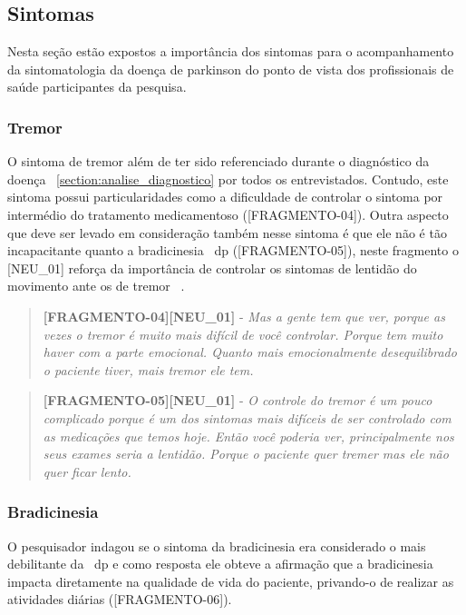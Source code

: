 \subsection{Sintomas}
Nesta seção estão expostos a importância dos sintomas para o acompanhamento da sintomatologia da doença de parkinson do ponto de vista dos profissionais de saúde participantes da pesquisa.

\subsubsection{Tremor}
O sintoma de tremor além de ter sido referenciado durante o diagnóstico da doença ~\ref{section:analise_diagnostico} por todos os entrevistados. Contudo, este sintoma possui particularidades como a dificuldade de controlar o sintoma por intermédio do tratamento medicamentoso ([FRAGMENTO-04]). Outra aspecto que deve ser levado em consideração também nesse sintoma é que ele não é tão incapacitante quanto a bradicinesia ~\ac{dp} ([FRAGMENTO-05]), neste fragmento o [NEU\_01] reforça da importância de controlar os sintomas de lentidão do movimento ante os de tremor ~\cite{do2007parkinson}.

\begin{quote}
\textbf{[FRAGMENTO-04][NEU\_01]} - 
\emph{
Mas a gente tem que ver, porque as vezes o tremor é muito mais difícil de você controlar. Porque tem muito haver com a parte emocional. Quanto mais emocionalmente desequilibrado o paciente tiver, mais tremor ele tem.
}
\end{quote}

\begin{quote}
\textbf{[FRAGMENTO-05][NEU\_01]} - 
\emph{
O controle do tremor é um pouco complicado porque é um dos sintomas mais difíceis de ser controlado com as medicações  que temos hoje.  Então você poderia ver, principalmente nos seus exames seria a lentidão. Porque o paciente quer tremer mas ele não quer ficar lento.
}
\end{quote}


\subsubsection{Bradicinesia}\label{section:analise_bradicinesia}

O pesquisador indagou se o sintoma da bradicinesia era considerado o mais debilitante da ~\ac{dp} e como resposta ele obteve a afirmação que a bradicinesia impacta diretamente na qualidade de vida do paciente, privando-o de realizar as atividades diárias ([FRAGMENTO-06]).

